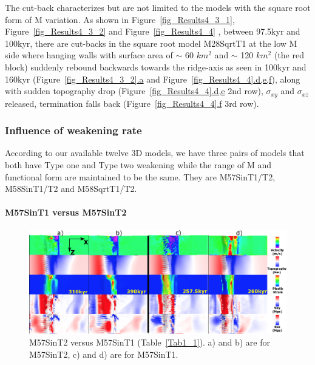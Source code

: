 The cut-back characterizes but are not limited to the models with the square root form of M variation. As shown in Figure~\hyperref[fig_Results4_3_1]{\ref{fig_Results4_3_1}}, Figure~\hyperref[fig_Results4_3_1]{\ref{fig_Results4_3_2}} and Figure~\hyperref[fig_Results4_4]{\ref{fig_Results4_4}} , between 97.5kyr and 100kyr, there are cut-backs in the square root model M28SqrtT1 at the low M side where hanging walls with surface area of $\sim$ 60 $km^{2}$ and $\sim$ 120 $km^{2}$ (the red block) suddenly rebound backwards towards the ridge-axis as seen in 100kyr and 160kyr (Figure~\hyperref[fig_Results4_3_1]{\ref{fig_Results4_3_2}.a} and Figure~\hyperref[fig_Results4_4]{\ref{fig_Results4_4}.d,e,f}), along with sudden topography drop (Figure~\hyperref[fig_Results4_4]{\ref{fig_Results4_4}.d,e} 2nd row), $\sigma_{xy}$ and $\sigma_{xz}$ released, termination falls back (Figure~\hyperref[fig_Results4_4]{\ref{fig_Results4_4}.f} 3rd row). 

\subsubsection{Influence of weakening rate}

According to our available twelve 3D models, we have three pairs of models that both have Type one and Type two  weakening while the range of M and functional form are maintained to be the same. They are M57SinT1/T2, M58SinT1/T2 and M58SqrtT1/T2.

\paragraph{M57SinT1 versus M57SinT2}

\begin{figure}[h]
 \centering
  \includegraphics[width=1.0\textwidth]{./Figures/fig_Results_Weakening_2_M57SinT1VST2_CutbackVSsecondaryFault.eps}
 \caption{M57SinT2 versus M57SinT1 (Table~\hyperref[Tab1_1]{\ref{Tab1_1}}). a) and b) are for M57SinT2, c) and d) are for M57SinT1.}
\label{fig_Results_Weakenging_2}
\end{figure}

